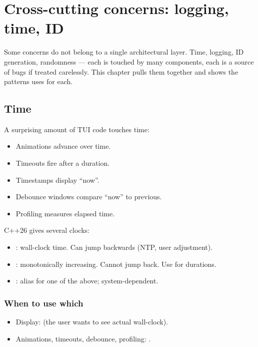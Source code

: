 \chapter{Cross-cutting concerns: logging, time, ID}
\label{ch:cross-cutting}

\begin{aside}
Some concerns do not belong to a single architectural layer.
Time, logging, ID generation, randomness --- each is touched
by many components, each is a source of bugs if treated
carelessly. This chapter pulls them together and shows the
patterns \maya{} uses for each.
\end{aside}

\section{Time}

A surprising amount of TUI code touches time:

\begin{itemize}[leftmargin=*]
  \item Animations advance over time.
  \item Timeouts fire after a duration.
  \item Timestamps display ``now''.
  \item Debounce windows compare ``now'' to previous.
  \item Profiling measures elapsed time.
\end{itemize}

C++26 gives several clocks:

\begin{itemize}[leftmargin=*]
  \item {}: wall-clock time.
    Can jump backwards (NTP, user adjustment).
  \item {}: monotonically
    increasing. Cannot jump back. Use for durations.
  \item {}: alias for
    one of the above; system-dependent.
\end{itemize}

\subsection*{When to use which}

\begin{itemize}[leftmargin=*]
  \item Display:  (the user wants to see
    actual wall-clock).
  \item Animations, timeouts, debounce, profiling:
    .
\end{itemize}

